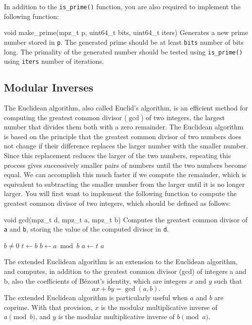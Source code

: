 In addition to the \texttt{is\_prime()} function, you are also required
to implement the following function:

\begin{funcdoc}{void make\_prime(mpz\_t p, uint64\_t bits, uint64\_t
  iters)}
  Generates a new prime number stored in \texttt{p}. The generated prime
  should be at least \texttt{bits} number of bits long. The primality of
  the generated number should be tested using \texttt{is\_prime()} using
  \texttt{iters} number of iterations.
\end{funcdoc}

\subsection{Modular Inverses}

The Euclidean algorithm, also called  Euclid's algorithm, is an
efficient method for computing the greatest common divisor ($\gcd$) of
two integers, the largest number that divides them both with a zero
remainder. The Euclidean algorithm is based on the principle that the
greatest common divisor of two numbers does not change if their
difference replaces the larger number with the smaller number. Since
this replacement reduces the larger of the two numbers, repeating this
process gives successively smaller pairs of numbers until the two
numbers become equal. We can accomplish this much faster if we compute
the remainder, which is equivalent to subtracting the smaller number
from the larger until it is no longer larger. You will first want to
implement the following function to compute the greatest common divisor
of two integers, which should be defined as follows:

\begin{funcdoc}{void gcd(mpz\_t d, mpz\_t a, mpz\_t b)}
  Computes the greatest common divisor of \texttt{a} and \texttt{b},
  storing the value of the computed divisor in \texttt{d}.

  \begin{codebox}
    \li \While $b \ne 0$
    \li \Then $t \gets b$
    \li       $b \gets a \bmod b$
    \li       $a \gets t$
        \End
    \li \Return $a$
  \end{codebox}
\end{funcdoc}

The extended Euclidean algorithm is an extension to the Euclidean
algorithm, and computes, in addition to the greatest common divisor
(gcd) of integers a and b, also the coefficients of B\'ezout's identity,
which are integers $x$ and $y$ such that
\[
  a x + b y = \gcd(a, b) .
\]
The extended Euclidean algorithm is particularly useful when $a$ and $b$
are coprime. With that provision, $x$ is the modular multiplicative
inverse of $a \pmod{b}$, and $y$ is the modular multiplicative inverse
of $b \pmod{a}$.

